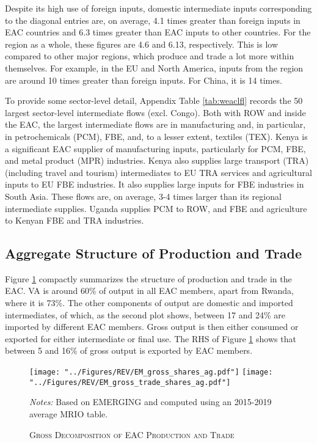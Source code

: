 \documentclass[a4paper]{article}
\begin{document}
Despite its high use of foreign inputs, domestic intermediate inputs corresponding to the diagonal entries are, on average, 4.1 times greater than foreign inputs in EAC countries and 6.3 times greater than EAC inputs to other countries. For the region as a whole, these figures are 4.6 and 6.13, respectively. This is low compared to other major regions, which produce and trade a lot more within themselves. For example, in the EU and North America, inputs from the region are around 10 times greater than foreign inputs. For China, it is 14 times. \newline

To provide some sector-level detail, Appendix Table \ref{tab:weaclfl} records the 50 largest sector-level intermediate flows (excl. Congo). Both with ROW and inside the EAC, the largest intermediate flows are in manufacturing and, in particular, in petrochemicals (PCM), FBE, and, to a lesser extent, textiles (TEX). Kenya is a significant EAC supplier of manufacturing inputs, particularly for PCM, FBE, and metal product (MPR) industries. Kenya also supplies large transport (TRA) (including travel and tourism) intermediates to EU TRA services and agricultural inputs to EU FBE industries. It also supplies large inputs for FBE industries in South Asia. These flows are, on average, 3-4 times larger than its regional intermediate supplies. Uganda supplies PCM to ROW, and FBE and agriculture to Kenyan FBE and TRA industries. 


\subsection{Aggregate Structure of Production and Trade}

Figure \ref{fig:shares_ag} compactly summarizes the structure of production and trade in the EAC. VA is around 60\% of output in all EAC members, apart from Rwanda, where it is 73\%. The other components of output are domestic and imported intermediates, of which, as the second plot shows, between 17 and 24\% are imported by different EAC members. Gross output is then either consumed or exported for either intermediate or final use. The RHS of Figure \ref{fig:shares_ag} shows that between 5 and 16\% of gross output is exported by EAC members. 

\begin{figure}[h!] 
\centering
\caption{\label{fig:shares_ag}\textsc{Gross Decomposition of EAC Production and Trade}}
\vspace{2mm}
\texttt{[image: "../Figures/REV/EM\_gross\_shares\_ag.pdf"]} \texttt{[image: "../Figures/REV/EM\_gross\_trade\_shares\_ag.pdf"]} \\
\raggedright
\scriptsize
\emph{Notes:} Based on EMERGING and computed using an 2015-2019 average MRIO table. 
\end{figure}
\FloatBarrier
\end{document}
